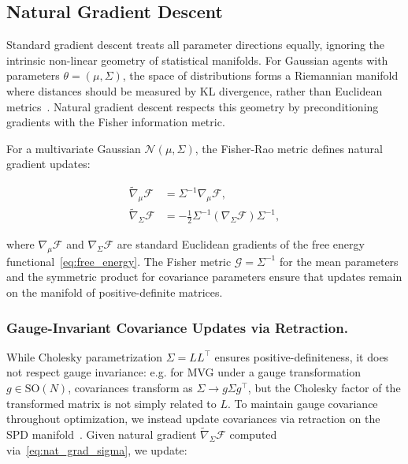 \documentclass[twoside,11pt]{article}
\begin{document}
\subsection{Natural Gradient Descent}

Standard gradient descent treats all parameter directions equally, ignoring the intrinsic non-linear geometry of statistical manifolds. For Gaussian agents with parameters $\theta = (\mu, \Sigma)$, the space of distributions forms a Riemannian manifold where distances should be measured by KL divergence, rather than Euclidean metrics~\citep{amari1998natural,martens2015optimizing}. Natural gradient descent respects this geometry by preconditioning gradients with the Fisher information metric.

For a multivariate Gaussian $\mathcal{N}(\mu, \Sigma)$, the Fisher-Rao metric defines natural gradient updates:

\begin{align}
\tilde{\nabla}_\mu \mathcal{F}&= \Sigma^{-1} \nabla_\mu \mathcal{F}, \label{eq:nat_grad_mu} \\
\tilde{\nabla}_\Sigma \mathcal{F} &= -\tfrac{1}{2} \Sigma^{-1} (\nabla_\Sigma \mathcal{F}) \Sigma^{-1}, \label{eq:nat_grad_sigma}
\end{align}

where $\nabla_\mu \mathcal{F}$ and $\nabla_\Sigma \mathcal{F}$ are standard Euclidean gradients of the free energy functional~\eqref{eq:free_energy}. The Fisher metric $\mathscr{G} = \Sigma^{-1}$ for the mean parameters and the symmetric product for covariance parameters ensure that updates remain on the manifold of positive-definite matrices.

\subsubsection{Gauge-Invariant Covariance Updates via Retraction.}  

While Cholesky parametrization $\Sigma = LL^\top$ ensures positive-definiteness, it does not respect gauge invariance: e.g. for MVG under a gauge transformation $g \in \text{SO}(N)$, covariances transform as $\Sigma \to g\Sigma g^\top$, but the Cholesky factor of the transformed matrix is not simply related to $L$. To maintain gauge covariance throughout optimization, we instead update covariances via retraction on the SPD manifold~\citep{absil2008optimization}. Given natural gradient $\tilde{\nabla}_\Sigma \mathcal{F}$ computed via~\eqref{eq:nat_grad_sigma}, we update:
\end{document}
